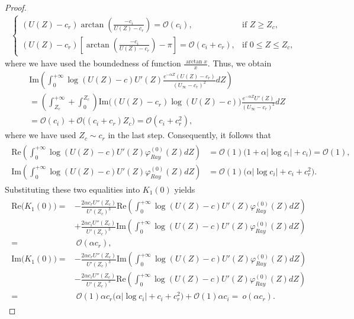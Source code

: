 \documentclass[10pt,a4paper]{amsart}
\begin{document}
\begin{proof}
\begin{align*}
\begin{cases}
					(U(Z)-c_r)\arctan\left(\frac{-c_i}{U(Z)-c_r}\right)=\mathcal{O}(c_i), & \mbox{if } Z\geq Z_c, \\
					(U(Z)-c_r)\left[\arctan\left(\frac{-c_i}{U(Z)-c_r}\right)-\pi\right]=\mathcal{O}(c_i+c_r), & \mbox{if~} 0\leq Z\leq Z_c,
				\end{cases} 
			\end{align*}
			where we have used the boundedness of function $\displaystyle \frac{\arctan x}{x}$. Thus, we obtain
			\begin{align*}
				&\text{Im}\left(\int_{0}^{+\infty}\log(U(Z)-c) U'(Z)\frac{e^{-\alpha Z}(U(Z)-c_r)}{(U_\infty-c_r)^2}dZ\right)\\
				& =\left(\int_{Z_c}^{+\infty}+\int_{0}^{Z_c}\right)\text{Im}\Big((U(Z)-c_r)\log(U(Z)-c) \Big)\frac{e^{-\alpha Z}U'(Z)}{(U_\infty-c_r)^2}dZ\\
				&=\mathcal{O}(c_i)+\mathcal{O}\big((c_i+c_r)Z_c\big)=\mathcal{O}(c_i+c_r^2),
			\end{align*}
			where we have used $Z_c\sim c_r$ in the last step. Consequently, it follows that
			\begin{align}\begin{aligned}
					\text{Re}\left(\int_{0}^{+\infty}\log(U(Z)-c) U'(Z)\varphi_{Ray}^{(0)}(Z)dZ\right) & =\mathcal{O}(1)\big(1+\alpha|\log c_i|+c_i\big)=\mathcal{O}(1), \\
					\text{Im}\left(\int_{0}^{+\infty}\log(U(Z)-c) U'(Z)\varphi_{Ray}^{(0)}(Z)dZ\right) & =\mathcal{O}(1)\big(\alpha|\log c_i|+c_i+c_r^2\big).\nonumber
			\end{aligned}\end{align}
Substituting these two equalities into $K_1(0)$ yields
			\begin{align}\label{K1-0-im}\begin{aligned}
					\text{Re}\big(K_1(0)\big) =& -\frac{2\alpha c_r U''(Z_c)}{U'(Z_c)^3} \text{Re}\left(\int_{0}^{+\infty}\log(U(Z)-c) U'(Z)\varphi_{Ray}^{(0)}(Z)dZ\right)\\
					&+\frac{2\alpha c_i U''(Z_c)}{U'(Z_c)^3} \text{Im}\left(\int_{0}^{+\infty}\log(U(Z)-c) U'(Z)\varphi_{Ray}^{(0)}(Z)dZ\right)\\
					= &~ \mathcal{O}(\alpha c_r),\\
					\text{Im}\big(K_1(0)\big) =& -\frac{2\alpha c_r U''(Z_c)}{U'(Z_c)^3} \text{Im}\left(\int_{0}^{+\infty}\log(U(Z)-c) U'(Z)\varphi_{Ray}^{(0)}(Z)dZ\right)\\
					&-\frac{2\alpha c_iU''(Z_c)}{U'(Z_c)^3} \text{Re}\left(\int_{0}^{+\infty}\log(U(Z)-c) U'(Z)\varphi_{Ray}^{(0)}(Z)dZ\right)\\
					= &~ \mathcal{O}(1)\alpha c_r\big(\alpha|\log c_i|+c_i+c_r^2\big)+\mathcal{O}(1)\alpha c_i=~o(\alpha c_r).
			\end{aligned}\end{align}
		

\end{proof}
\end{document}
